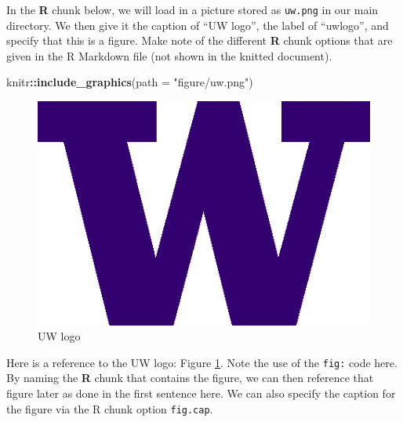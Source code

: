 \documentclass[ms]{uncgdissertationexp}
\newenvironment{Shaded}{\begin{snugshade}}{\end{snugshade}}
\newcommand{\KeywordTok}[1]{\textcolor[rgb]{0.13,0.29,0.53}{\textbf{#1}}}
\newcommand{\DataTypeTok}[1]{\textcolor[rgb]{0.13,0.29,0.53}{#1}}
\newcommand{\StringTok}[1]{\textcolor[rgb]{0.31,0.60,0.02}{#1}}
\newcommand{\OperatorTok}[1]{\textcolor[rgb]{0.81,0.36,0.00}{\textbf{#1}}}
\newcommand{\NormalTok}[1]{#1}
\theoremstyle{plain}
\theoremstyle{definition}
\theoremstyle{remark}
\begin{document}
  In the \textbf{R} chunk below, we will load in a picture stored as
  \texttt{uw.png} in our main directory. We then give it the caption of
  ``UW logo'', the label of ``uwlogo'', and specify that this is a figure.
  Make note of the different \textbf{R} chunk options that are given in
  the R Markdown file (not shown in the knitted document).
  \begin{Shaded}
  \begin{Highlighting}[]
  \NormalTok{knitr}\OperatorTok{::}\KeywordTok{include_graphics}\NormalTok{(}\DataTypeTok{path =} \StringTok{"figure/uw.png"}\NormalTok{)}
  \end{Highlighting}
  \end{Shaded}
  \begin{figure}
  \includegraphics[width=6.25in]{figure/uw} \caption{UW logo}\label{fig:uwlogo}
  \end{figure}
  Here is a reference to the UW logo: Figure \ref{fig:uwlogo}. Note the
  use of the \texttt{fig:} code here. By naming the \textbf{R} chunk that
  contains the figure, we can then reference that figure later as done in
  the first sentence here. We can also specify the caption for the figure
  via the R chunk option \texttt{fig.cap}.
  
  \clearpage 
  
\end{document}
